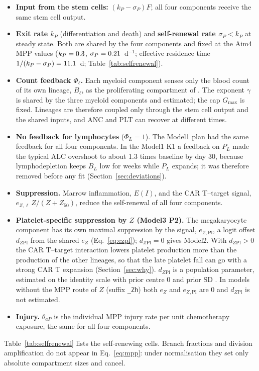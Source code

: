 \documentclass[11pt]{article}
\begin{document}
\begin{itemize}
\item \textbf{Input from the stem cells:} $(k_P-\sigma_P)F$; all four components receive the same stem cell output.
\item \textbf{Exit rate $k_P$} (differentiation and death) and \textbf{self-renewal rate $\sigma_P<k_P$} at steady state. Both are shared by the four components and fixed at the Aim4 MPP values ($k_P=0.3$, $\sigma_P=0.21$~d$^{-1}$; effective residence time $1/(k_P-\sigma_P)=11.1$~d; Table~\ref{tab:selfrenewal}).
\item \textbf{Count feedback $\Phi_\ell$.} Each myeloid component senses only the blood count of its own lineage, $B_\ell$, as the proliferating compartment of \citet{friberg2002}. The exponent $\gamma$ is shared by the three myeloid components and estimated; the cap $G_{\max}$ is fixed. Lineages are therefore coupled only through the stem cell output and the shared inputs, and ANC and PLT can recover at different times.
\item \textbf{No feedback for lymphocytes} ($\Phi_L=1$). The Model1 plan had the same feedback for all four components. In the Model1 K1 a feedback on $P_L$ made the typical ALC overshoot to about 1.3 times baseline by day 30, because lymphodepletion keeps $B_L$ low for weeks while $P_L$ expands; it was therefore removed before any fit (Section~\ref{sec:deviations}).
\item \textbf{Suppression.} Marrow inflammation, $E(I)$, and the CAR T--target signal, $e_{Z,\ell}\,Z/(Z+Z_{50})$, reduce the self-renewal of all four components.
\item \textbf{Platelet-specific suppression by $Z$ (Model3 P2).} The megakaryocyte component has its own maximal suppression by the signal, $e_{Z,\mathrm{Pl}}$, a logit offset $d_{Z\mathrm{Pl}}$ from the shared $e_Z$ (Eq.~\ref{eq:ezpl}); $d_{Z\mathrm{Pl}}=0$ gives Model2. With $d_{Z\mathrm{Pl}}>0$ the CAR T--target interaction lowers platelet production more than the production of the other lineages, so that the late platelet fall can go with a strong CAR T expansion (Section~\ref{sec:why}). $d_{Z\mathrm{Pl}}$ is a population parameter, estimated on the identity scale with prior centre 0 and prior SD \valDzplSd. In models without the MPP route of $Z$ (suffix \texttt{\_Zh}) both $e_Z$ and $e_{Z,\mathrm{Pl}}$ are 0 and $d_{Z\mathrm{Pl}}$ is not estimated.
\item \textbf{Injury.} $\theta_{aP}$ is the individual MPP injury rate per unit chemotherapy exposure, the same for all four components.
\end{itemize}
Table~\ref{tab:selfrenewal} lists the self-renewing cells. Branch fractions and division amplification do not appear in Eq.~\ref{eq:mpp}: under normalisation they set only absolute compartment sizes and cancel.
\end{document}

